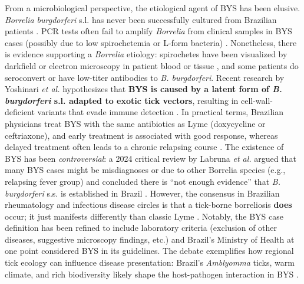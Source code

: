 \documentclass[11pt,letterpaper]{article}
\begin{document}
From a microbiological perspective, the etiological agent of BYS has been elusive. \textit{Borrelia burgdorferi} s.l. has never been successfully cultured from Brazilian patients \citep{Yoshinari2022p, Yoshinari2022q}. PCR tests often fail to amplify \textit{Borrelia} from clinical samples in BYS cases (possibly due to low spirochetemia or L-form bacteria) \citep{Lucca2024l}. Nonetheless, there is evidence supporting a \textit{Borrelia} etiology: spirochetes have been visualized by darkfield or electron microscopy in patient blood or tissue \citep{Lucca2024m}, and some patients do seroconvert or have low-titer antibodies to \textit{B. burgdorferi}. Recent research by Yoshinari \textit{et al.} hypothesizes that \textbf{BYS is caused by a latent form of \textit{B. burgdorferi} s.l. adapted to exotic tick vectors}, resulting in cell-wall-deficient variants that evade immune detection \citep{Yoshinari2022r, Yoshinari2022s}. In practical terms, Brazilian physicians treat BYS with the same antibiotics as Lyme (doxycycline or ceftriaxone), and early treatment is associated with good response, whereas delayed treatment often leads to a chronic relapsing course \citep{Yoshinari2022t}. The existence of BYS has been \textit{controversial}: a 2024 critical review by Labruna \textit{et al.} argued that many BYS cases might be misdiagnoses or due to other Borrelia species (e.g., relapsing fever group) and concluded there is “not enough evidence” that \textit{B. burgdorferi} s.s. is established in Brazil \citep{Labruna2024a}. However, the consensus in Brazilian rheumatology and infectious disease circles is that a tick-borne borreliosis \textbf{does} occur; it just manifests differently than classic Lyme \citep{Yoshinari2022u, Yoshinari2022v}. Notably, the BYS case definition has been refined to include laboratory criteria (exclusion of other diseases, suggestive microscopy findings, etc.) and Brazil’s Ministry of Health at one point considered BYS in its guidelines. The debate exemplifies how regional tick ecology can influence disease presentation: Brazil’s \textit{Amblyomma} ticks, warm climate, and rich biodiversity likely shape the host-pathogen interaction in BYS \citep{Yoshinari2022w}.
\end{document}
